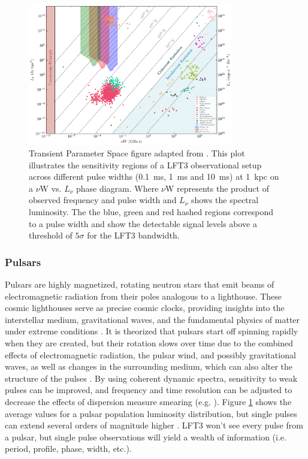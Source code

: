 \begin{figure}[!ht]
    \centering
    \includegraphics[width=0.8\textwidth]{figures/phase_space.png} 
    \caption{Transient Parameter Space figure adapted from \citet{pietka}. This plot illustrates the sensitivity regions of a LFT3 observational setup across different pulse widths (0.1~ms, 1~ms and 10~ms) at 1~kpc on a $\nu \text{W}$ vs. $L_\nu$ phase diagram. Where $\nu \text{W}$ represents the product of observed frequency and pulse width and $L_\nu$ shows the spectral luminosity. The the blue, green and red hashed regions correspond to a pulse width and show the detectable signal levels above a threshold of $5\sigma$ for the LFT3 bandwidth.}
    \label{fig:transient_space}
\end{figure}

\subsubsection{Pulsars}
Pulsars are highly magnetized, rotating neutron stars that emit beams of electromagnetic radiation from their poles analogous to a lighthouse. These cosmic lighthouses serve as precise cosmic clocks, providing insights into the interstellar medium, gravitational waves, and the fundamental physics of matter under extreme conditions \citep{pulsar_handbook, agazie_nanograv_2023}. It is theorized that pulsars start off spinning rapidly when they are created, but their rotation slows over time due to the combined effects of electromagnetic radiation, the pulsar wind, and possibly gravitational waves, as well as changes in the surrounding medium, which can also alter the structure of the pulses \citep{LW_2013}. By using coherent dynamic spectra, sensitivity to weak pulses can be improved, and frequency and time resolution can be adjusted to decrease the effects of dispersion measure smearing (e.g. \cite{WL_2020}). Figure \ref{fig:transient_space} shows the average values for a pulsar population luminosity distribution, but single pulses can extend several orders of magnitude higher \citep{karuppusamy_giant_2010}. LFT3 won't see every pulse from a pulsar, but single pulse observations will yield a wealth of information (i.e. period, profile, phase, width, etc.). 


